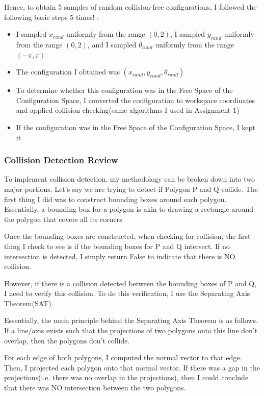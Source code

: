 \documentclass{article}
\begin{document}
Hence, to obtain 5 samples of random collision-free configurations, I followed the following basic steps 5 times! : 
\begin{itemize}
    \item I sampled $x_{rand}$ uniformly from the range $(0, 2)$, I sampled $y_{rand}$ uniformly from the range $(0, 2)$, and I sampled $\theta_{rand}$ uniformly from the range $(-\pi, \pi)$
    \item The configuration I obtained was $(x_{rand}, y_{rand}, \theta_{rand})$
    \item To determine whether this configuration was in the Free Space of the Configuration Space, I converted the configuration to workspace coordinates and applied collision checking(same algorithms I used in Assignment 1)
    \item If the configuration was in the Free Space of the Configuration Space, I kept it
\end{itemize}

\subsubsection{Collision Detection Review}
To implement collision detection, my methodology can be broken down into two major portions. Let's say we are trying to detect if Polygon P and Q collide. The first thing I did was to construct bounding boxes around each polygon. Essentially, a bounding box for a polygon is akin to drawing a rectangle around the polygon that covers all its corners \newline 

Once the bounding boxes are constructed, when checking for collision, the first thing I check to see is if the bounding boxes for P and Q intersect. If no intersection is detected, I simply return False to indicate that there is NO collision. \newline 

However, if there is a collision detected between the bounding boxes of P and Q, I need to verify this collision. To do this verification, I use the Separating Axis Theorem(SAT). \newline 

Essentially, the main principle behind the Separating Axis Theorem is as follows. If a line/axis exists such that the projections of two polygons onto this line don't overlap, then the polygons don't collide. \newline 

For each edge of both polygons, I computed the normal vector to that edge. Then, I projected each polygon onto that normal vector. If there was a gap in the projections(i.e. there was no overlap in the projections), then I could conclude that there was NO intersection between the two polygons. 
\end{document}
